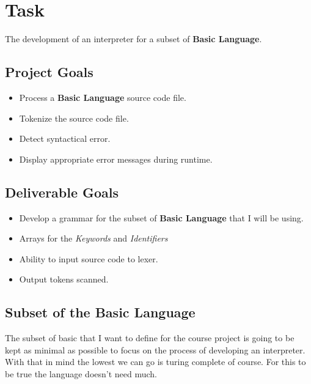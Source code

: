 \documentclass{report}
\begin{document}


\section*{Task}
The development of an interpreter for a subset of \textbf{Basic Language}. 

\vspace{0.5cm}

\subsection*{Project Goals}
\begin{itemize}
	\item Process a \textbf{Basic Language} source code file. 
	\item Tokenize the source code file. 
	\item Detect syntactical error.
	\item Display appropriate error messages during runtime. 
\end{itemize}

\subsection*{Deliverable Goals}
\begin{itemize}
	\item Develop a grammar for the subset of \textbf{Basic Language} that I will be using. 
	\item Arrays for the \emph{Keywords} and \emph{Identifiers}
	\item Ability to input source code to lexer. 
	\item Output tokens scanned. 
\end{itemize}

\subsection*{Subset of the Basic Language}
The subset of basic that I want to define for the course project is going to be kept as minimal as possible to focus on the process of developing an interpreter. 
With that in mind the lowest we can go is turing complete of course. 
For this to be true the language doesn't need much. 
\end{document}
